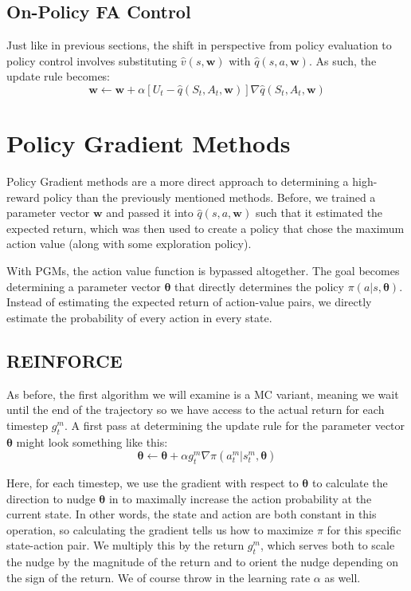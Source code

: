 \documentclass{article}
\begin{document}
\subsection{On-Policy FA Control}
Just like in previous sections, the shift in perspective from policy evaluation to policy control involves substituting $\hat{v}(s, \bm{w})$ 
with $\hat{q}(s, a, \bm{w})$. As such, the update rule becomes:
\begin{equation}
  \bm{w} \leftarrow \bm{w} + \alpha [U_t - \hat{q}(S_t, A_t, \bm{w})] \nabla \hat{q}(S_t, A_t, \bm{w})
\end{equation}



\section{Policy Gradient Methods}
Policy Gradient methods are a more direct approach to determining a high-reward policy than the previously mentioned methods. 
Before, we trained a parameter vector $\bm{w}$ and passed it into $\hat{q}(s, a, \bm{w})$ such that it estimated the expected 
return, which was then used to create a policy that chose the maximum action value (along with some exploration policy).

With PGMs, the action value function is bypassed altogether. The goal becomes determining a parameter vector $\bm{\theta}$
that directly determines the policy $\pi(a|s, \bm{\theta})$. Instead of estimating the expected return of action-value pairs, we
directly estimate the probability of every action in every state.

\subsection{REINFORCE}
As before, the first algorithm we will examine is a MC variant, meaning we wait until the end of the trajectory so we have access to the actual return for each timestep $g_t^m$. 
A first pass at determining the update rule for the parameter vector $\bm{\theta}$ might look something like this:
\begin{equation}
  \bm{\theta} \leftarrow \bm{\theta} + \alpha g_t^m \nabla \pi(a_t^m|s_t^m, \bm{\theta})
\end{equation}

Here, for each timestep, we use the gradient with respect to $\bm{\theta}$ to calculate the direction to nudge $\bm{\theta}$ in to maximally increase the action probability at 
the current state. In other words, the state and action are both constant in this operation, so calculating the gradient tells us how to maximize $\pi$ for this specific state-action pair.
We multiply this by the return $g_t^m$, which serves both to scale the nudge by the magnitude of the return and to orient the nudge depending on the sign of the return.
We of course throw in the learning rate $\alpha$ as well. 
\end{document}
